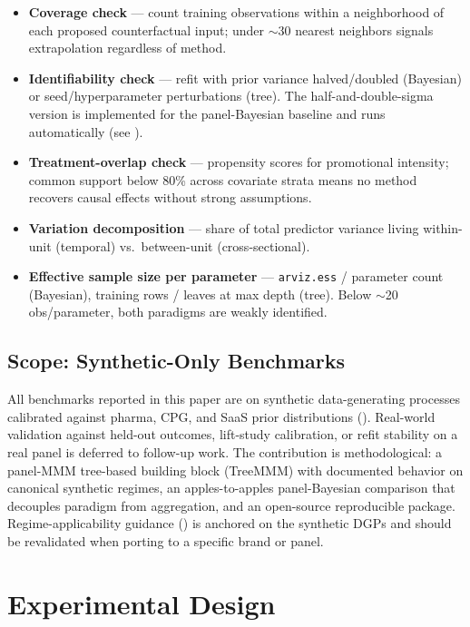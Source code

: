 \documentclass[review,12pt]{elsarticle}
\begin{document}
\begin{itemize}
\item \textbf{Coverage check} --- count training observations within a
  neighborhood of each proposed counterfactual input; under $\sim$30 nearest
  neighbors signals extrapolation regardless of method.
\item \textbf{Identifiability check} --- refit with prior variance
  halved/doubled (Bayesian) or seed/hyperparameter perturbations (tree). The
  half-and-double-sigma version is implemented for the panel-Bayesian baseline
  and runs automatically (see ).
\item \textbf{Treatment-overlap check} --- propensity scores for promotional
  intensity; common support below 80\% across covariate strata means no method
  recovers causal effects without strong assumptions.
\item \textbf{Variation decomposition} --- share of total predictor variance
  living within-unit (temporal) vs.\ between-unit (cross-sectional).
\item \textbf{Effective sample size per parameter} --- \texttt{arviz.ess} /
  parameter count (Bayesian), training rows / leaves at max depth (tree).
  Below $\sim$20 obs/parameter, both paradigms are weakly identified.
\end{itemize}

\subsection{Scope: Synthetic-Only Benchmarks}
\label{sec:intro:synthetic}

All benchmarks reported in this paper are on synthetic data-generating
processes calibrated against pharma, CPG, and SaaS prior distributions
(). Real-world validation against held-out outcomes,
lift-study calibration, or refit stability on a real panel is deferred to
follow-up work. The contribution is methodological: a panel-MMM tree-based
building block (TreeMMM) with documented behavior on canonical synthetic
regimes, an apples-to-apples panel-Bayesian comparison that decouples paradigm
from aggregation, and an open-source reproducible package. Regime-applicability
guidance () is anchored on the synthetic DGPs and
should be revalidated when porting to a specific brand or panel.

\section{Experimental Design}
\label{sec:design}
\end{document}
